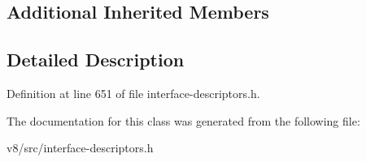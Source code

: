 \subsection*{Additional Inherited Members}


\subsection{Detailed Description}


Definition at line 651 of file interface-\/descriptors.\+h.



The documentation for this class was generated from the following file\+:\begin{DoxyCompactItemize}
\item 
v8/src/interface-\/descriptors.\+h\end{DoxyCompactItemize}
